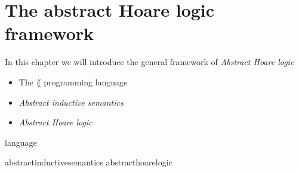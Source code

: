 \chapter{The abstract Hoare logic framework}

In this chapter we will introduce the general framework of 
\textit{Abstract Hoare logic}

\begin{itemize}
  \item The $\lang$ programming language
  \item \textit{Abstract inductive semantics}
  \item \textit{Abstract Hoare logic}
\end{itemize}

{language}

{abstractinductivesemantics}
{abstracthoarelogic}
